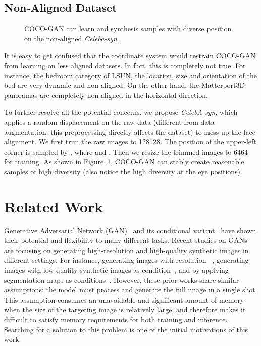 \documentclass{article}
\begin{document}
    \subsection{Non-Aligned Dataset}
    
        \begin{figure}[t]
            \centering
            \vspace{-1.5em}
            \caption{COCO-GAN can learn and synthesis samples with diverse position on the non-aligned \textit{Celeba-syn}.}
            \label{fig:celeba-syn}
            \vspace{-1.5em}
        \end{figure}
    
        It is easy to get confused that the coordinate system would restrain COCO-GAN from learning on less aligned datasets. In fact, this is completely not true. For instance, the bedroom category of LSUN, the location, size and orientation of the bed are very dynamic and non-aligned. On the other hand, the Matterport3D panoramas are completely non-aligned in the horizontal direction. 
        
        To further resolve all the potential concerns, we propose \textit{CelebA-syn}, which applies a random displacement on the raw data (different from data augmentation, this preprocessing directly affects the dataset) to mess up the face alignment. We first trim the raw images to 128128. The position of the upper-left corner is sampled by , where  and . Then we resize the trimmed images to 6464 for training. As shown in Figure~\ref{fig:celeba-syn}, COCO-GAN can stably create reasonable samples of high diversity (also notice the high diversity at the eye positions).
         \section{Related Work}

    Generative Adversarial Network (GAN)~\cite{GANs} and its conditional variant~\cite{cGAN} have shown their potential and flexibility to many different tasks. Recent studies on GANs are focusing on generating high-resolution and high-quality synthetic images in different settings. For instance, generating images with  resolution ~\cite{PGGAN,R1-regularizer}, generating images with low-quality synthetic images as condition~\cite{apple-eye}, and by applying segmentation maps as conditions~\cite{pix2pix-HD}. However, these prior works share similar assumptions: the model must process and generate the full image in a single shot. This assumption consumes an unavoidable and significant amount of memory when the size of the targeting image is relatively large, and therefore makes it difficult to satisfy memory requirements for both training and inference. Searching for a solution to this problem is one of the initial motivations of this work.
\end{document}
